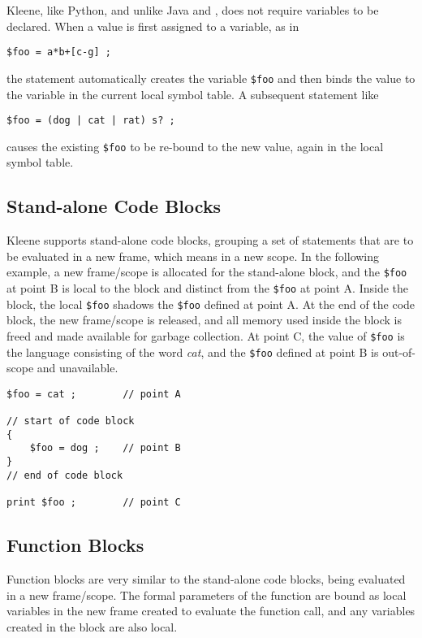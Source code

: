 Kleene, like Python, and unlike Java and \CPP{}, does not require
variables to be declared.
When a value is first assigned to a variable, as in

\begin{Verbatim}
$foo = a*b+[c-g] ;
\end{Verbatim}

\noindent
the statement automatically creates the variable \verb!$foo! and then binds
the \fsm{} value to the variable in the current local symbol table.  A
subsequent statement like

\begin{Verbatim}
$foo = (dog | cat | rat) s? ;
\end{Verbatim}

\noindent
causes the existing \verb!$foo! to be re-bound to the new \fsm{} 
value, again in the local symbol table.


\subsection{Stand-alone Code Blocks}

Kleene supports stand-alone code blocks, grouping a set of statements
that are to be evaluated in a new frame, which means in a new scope.
In the following example, a new frame/scope is allocated for the
stand-alone block, and the \verb!$foo! at point B is local to the block
and distinct from the
\verb!$foo! at point A. Inside the block, the local \verb!$foo! shadows
the \verb!$foo! defined at point A.  At the end of the code block, the new
frame/scope is released, and all memory used inside the block is freed
and made available for garbage collection.  At point C, the value of \verb!$foo! is the
language consisting of the word \emph{cat}, and the \verb!$foo! defined
at point B is out-of-scope and unavailable.

\begin{Verbatim}
$foo = cat ;        // point A

// start of code block
{
    $foo = dog ;    // point B
}
// end of code block

print $foo ;        // point C
\end{Verbatim}

\subsection{Function Blocks}

Function blocks are very similar to the stand-alone code blocks, being
evaluated in a new frame/scope.  The formal parameters of the function are
bound as local variables in the
new frame created to evaluate the function call, and any variables created in the block are also local.


